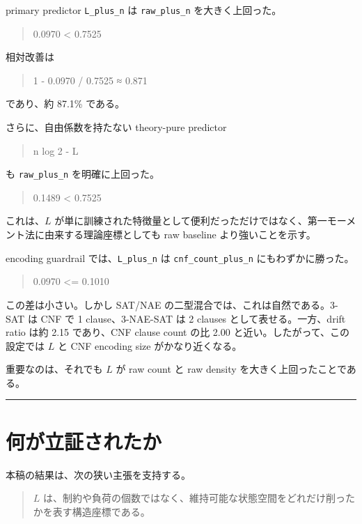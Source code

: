 \documentclass[12pt,a4paper]{article}
\begin{document}
primary predictor \texttt{L\_plus\_n} は \texttt{raw\_plus\_n} を大きく上回った。

\begin{quote}
\small
0.0970 < 0.7525
\end{quote}

相対改善は

\begin{quote}
\small
1 - 0.0970 / 0.7525 ≈ 0.871
\end{quote}

であり、約 87.1\% である。

さらに、自由係数を持たない theory-pure predictor

\begin{quote}
\small
n log 2 - L
\end{quote}

も \texttt{raw\_plus\_n} を明確に上回った。

\begin{quote}
\small
0.1489 < 0.7525
\end{quote}

これは、$L$ が単に訓練された特徴量として便利だっただけではなく、第一モーメント法に由来する理論座標としても raw baseline より強いことを示す。

encoding guardrail では、\texttt{L\_plus\_n} は \texttt{cnf\_count\_plus\_n} にもわずかに勝った。

\begin{quote}
\small
0.0970 <= 0.1010
\end{quote}

この差は小さい。しかし SAT/NAE の二型混合では、これは自然である。3-SAT は CNF で 1 clause、3-NAE-SAT は 2 clauses として表せる。一方、drift ratio は約 2.15 であり、CNF clause count の比 2.00 と近い。したがって、この設定では $L$ と CNF encoding size がかなり近くなる。

重要なのは、それでも $L$ が raw count と raw density を大きく上回ったことである。

\begin{center}\rule{0.5\linewidth}{0.5pt}\end{center}

\section{何が立証されたか}\label{ux4f55ux304cux7acbux8a3cux3055ux308cux305fux304b}

本稿の結果は、次の狭い主張を支持する。

\begin{quote}
$L$ は、制約や負荷の個数ではなく、維持可能な状態空間をどれだけ削ったかを表す構造座標である。
\end{quote}
\end{document}
